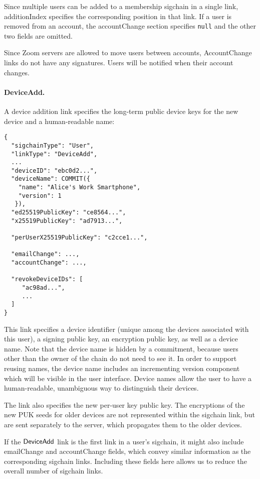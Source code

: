 Since multiple users can be added to a membership sigchain in a single link,
\textsf{additionIndex} specifies the corresponding position in that link. If a user
is removed from an account, the \textsf{accountChange} section specifies \accountID
\texttt{null} and the other two fields are omitted.

Since Zoom servers are allowed to move users between accounts, \textsf{AccountChange} links do
not have any signatures. Users will be notified when their account changes.

\paragraph{DeviceAdd.} A device addition link specifies the long-term public device keys for the new
device and a human-readable name:

\begin{Verbatim}
{
  "sigchainType": "User",
  "linkType": "DeviceAdd",
  ...
  "deviceID": "ebc0d2...",
  "deviceName": COMMIT({
    "name": "Alice's Work Smartphone",
    "version": 1
   }),
  "ed25519PublicKey": "ce8564...",
  "x25519PublicKey": "ad7913...",

  "perUserX25519PublicKey": "c2cce1...",

  "emailChange": ...,
  "accountChange": ...,

  "revokeDeviceIDs": [
     "ac98ad...",
     ...
  ]
}
\end{Verbatim}

This link specifies a device identifier (unique among the devices associated with this user), a
signing public key, an encryption public key, as well as a device name. Note that the device name is
hidden by a commitment, because users other than the owner of the chain do not need to see it. In
order to support reusing names, the device name includes an incrementing version component which
will be visible in the user interface. Device names allow the user to have a human-readable,
unambiguous way to distinguish their devices.

The link also specifies the new per-user key public key. The encryptions of the new PUK seeds for
older devices are not represented within the sigchain link, but are sent separately to the server,
which propagates them to the older devices.

If the $\mathsf{DeviceAdd}{}$ link is the first link in a user's sigchain, it might also include
\textsf{emailChange} and \textsf{accountChange} fields, which convey similar information as the
corresponding sigchain links. Including these fields here allows us to reduce the overall number of
sigchain links.

